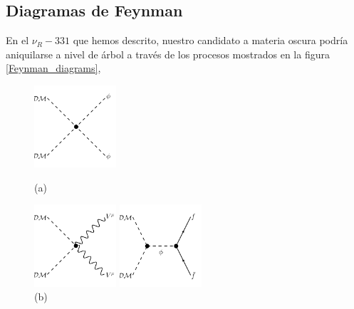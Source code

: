 

\subsection[\hspace{-0.4in}) Diagramas de Feynman]{Diagramas de Feynman}
En el $\nu_R-331$ que hemos descrito, nuestro candidato a materia oscura podría aniquilarse a nivel de árbol a través de los procesos mostrados en la figura \ref{Feynman_diagrams},
\begin{figure}[h]
\centering
\begin{minipage}{.35\textwidth}
  \centering
  \includegraphics[height=1.2in]{Images/DM_ann_1.pdf}
  \caption*{(a)}
\end{minipage}%
\centering
\begin{minipage}{.35\textwidth}
  \centering
  \includegraphics[height=1.2in]{Images/DM_ann_2.pdf}
  \caption*{(b)}
\end{minipage}%
\centering
\begin{minipage}{.35\textwidth}
  \centering
  \includegraphics[height=1.2in]{Images/DM_ann_3.pdf}

\end{minipage}
\end{figure}
